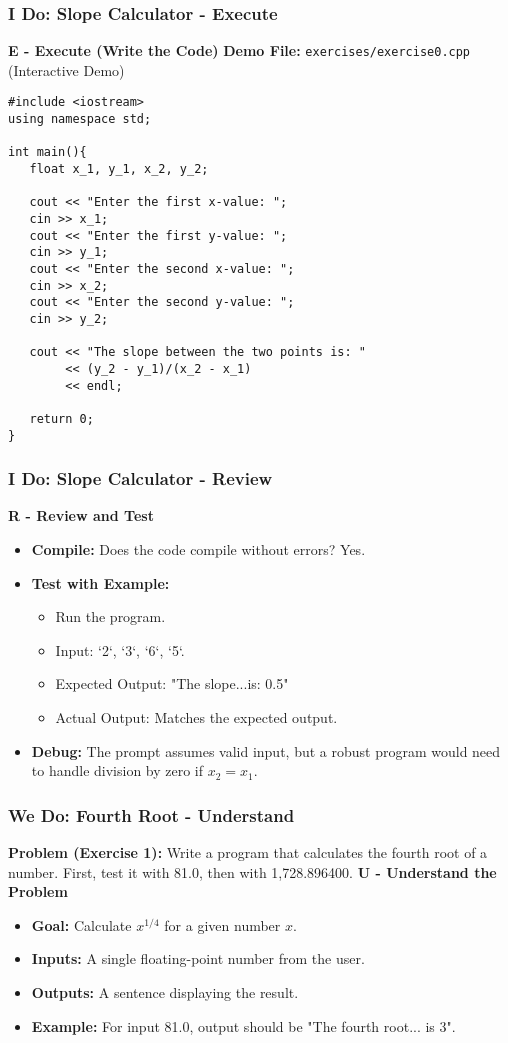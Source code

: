 \documentclass{beamer}
\begin{document}
\begin{frame}[fragile]
\frametitle{I Do: Slope Calculator - Execute}
\textbf{E - Execute (Write the Code)}
\textbf{Demo File:} \texttt{exercises/exercise0.cpp} (Interactive Demo)
\begin{verbatim}
#include <iostream>
using namespace std;

int main(){
   float x_1, y_1, x_2, y_2;

   cout << "Enter the first x-value: ";
   cin >> x_1;
   cout << "Enter the first y-value: ";
   cin >> y_1;
   cout << "Enter the second x-value: ";
   cin >> x_2;
   cout << "Enter the second y-value: ";
   cin >> y_2;

   cout << "The slope between the two points is: "
        << (y_2 - y_1)/(x_2 - x_1)
        << endl;

   return 0;
}
\end{verbatim}
\end{frame}

\begin{frame}
\frametitle{I Do: Slope Calculator - Review}
\textbf{R - Review and Test}
\begin{itemize}
    \item \textbf{Compile:} Does the code compile without errors? Yes.
    \item \textbf{Test with Example:}
    \begin{itemize}
        \item Run the program.
        \item Input: `2`, `3`, `6`, `5`.
        \item Expected Output: "The slope...is: 0.5"
        \item Actual Output: Matches the expected output.
    \end{itemize}
    \item \textbf{Debug:} The prompt assumes valid input, but a robust program would need to handle division by zero if $x_2 = x_1$.
\end{itemize}
\end{frame}

\begin{frame}
\frametitle{We Do: Fourth Root - Understand}
\textbf{Problem (Exercise 1):} Write a program that calculates the fourth root of a number. First, test it with 81.0, then with 1,728.896400.
\vfill
\textbf{U - Understand the Problem}
\begin{itemize}
    \item \textbf{Goal:} Calculate $x^{1/4}$ for a given number $x$.
    \item \textbf{Inputs:} A single floating-point number from the user.
    \item \textbf{Outputs:} A sentence displaying the result.
    \item \textbf{Example:} For input 81.0, output should be "The fourth root... is 3".
\end{itemize}
\end{frame}
\end{document}
